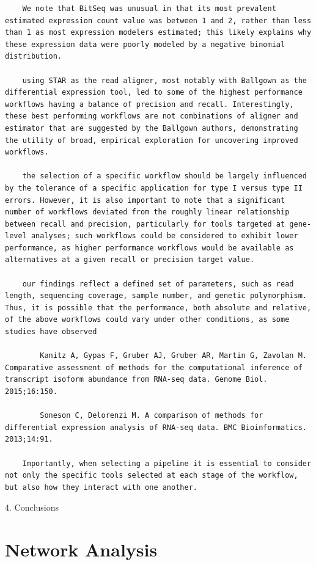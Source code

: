 \documentclass[
]{book}
\begin{document}
\begin{verbatim}
    We note that BitSeq was unusual in that its most prevalent estimated expression count value was between 1 and 2, rather than less than 1 as most expression modelers estimated; this likely explains why these expression data were poorly modeled by a negative binomial distribution.

    using STAR as the read aligner, most notably with Ballgown as the differential expression tool, led to some of the highest performance workflows having a balance of precision and recall. Interestingly, these best performing workflows are not combinations of aligner and estimator that are suggested by the Ballgown authors, demonstrating the utility of broad, empirical exploration for uncovering improved workflows.    

    the selection of a specific workflow should be largely influenced by the tolerance of a specific application for type I versus type II errors. However, it is also important to note that a significant number of workflows deviated from the roughly linear relationship between recall and precision, particularly for tools targeted at gene-level analyses; such workflows could be considered to exhibit lower performance, as higher performance workflows would be available as alternatives at a given recall or precision target value.

    our findings reflect a defined set of parameters, such as read length, sequencing coverage, sample number, and genetic polymorphism. Thus, it is possible that the performance, both absolute and relative, of the above workflows could vary under other conditions, as some studies have observed

        Kanitz A, Gypas F, Gruber AJ, Gruber AR, Martin G, Zavolan M. Comparative assessment of methods for the computational inference of transcript isoform abundance from RNA-seq data. Genome Biol. 2015;16:150.

        Soneson C, Delorenzi M. A comparison of methods for differential expression analysis of RNA-seq data. BMC Bioinformatics. 2013;14:91.

    Importantly, when selecting a pipeline it is essential to consider not only the specific tools selected at each stage of the workflow, but also how they interact with one another.
\end{verbatim}

4. Conclusions

\hypertarget{network-analysis-1}{%
\section{Network Analysis}\label{network-analysis-1}}
\end{document}
